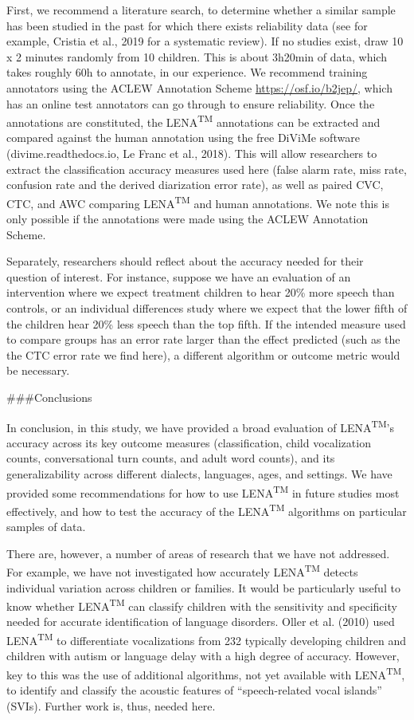 \documentclass[english,table,man,floatsintext]{apa6}
\begin{document}
First, we recommend a literature search, to determine whether a similar sample has been studied in the past for which there exists reliability data (see for example, Cristia et al., 2019 for a systematic review). If no studies exist, draw 10 x 2 minutes randomly from 10 children. This is about 3h20min of data, which takes roughly 60h to annotate, in our experience. We recommend training annotators using the ACLEW Annotation Scheme \url{https://osf.io/b2jep/}, which has an online test annotators can go through to ensure reliability. Once the annotations are constituted, the LENA\textsuperscript{TM} annotations can be extracted and compared against the human annotation using the free DiViMe software (divime.readthedocs.io, Le Franc et al., 2018). This will allow researchers to extract the classification accuracy measures used here (false alarm rate, miss rate, confusion rate and the derived diarization error rate), as well as paired CVC, CTC, and AWC comparing LENA\textsuperscript{TM} and human annotations. We note this is only possible if the annotations were made using the ACLEW Annotation Scheme.

Separately, researchers should reflect about the accuracy needed for their question of interest. For instance, suppose we have an evaluation of an intervention where we expect treatment children to hear 20\% more speech than controls, or an individual differences study where we expect that the lower fifth of the children hear 20\% less speech than the top fifth. If the intended measure used to compare groups has an error rate larger than the effect predicted (such as the the CTC error rate we find here), a different algorithm or outcome metric would be necessary.

\#\#\#Conclusions

In conclusion, in this study, we have provided a broad evaluation of LENA\textsuperscript{TM}'s accuracy across its key outcome measures (classification, child vocalization counts, conversational turn counts, and adult word counts), and its generalizability across different dialects, languages, ages, and settings. We have provided some recommendations for how to use LENA\textsuperscript{TM} in future studies most effectively, and how to test the accuracy of the LENA\textsuperscript{TM} algorithms on particular samples of data.

There are, however, a number of areas of research that we have not addressed. For example, we have not investigated how accurately LENA\textsuperscript{TM} detects individual variation across children or families. It would be particularly useful to know whether LENA\textsuperscript{TM} can classify children with the sensitivity and specificity needed for accurate identification of language disorders. Oller et al. (2010) used LENA\textsuperscript{TM} to differentiate vocalizations from 232 typically developing children and children with autism or language delay with a high degree of accuracy. However, key to this was the use of additional algorithms, not yet available with LENA\textsuperscript{TM}, to identify and classify the acoustic features of \enquote{speech-related vocal islands} (SVIs). Further work is, thus, needed here.
\end{document}
